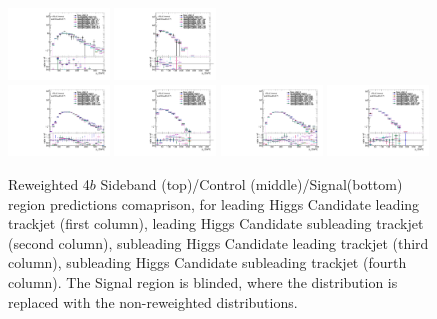 \begin{figure}[htbp!]
\begin{center}
\includegraphics[angle=270, width=0.24\textwidth]{./figures/boosted/AppendixReweight/Compare/Data_FourTag_Control_directcompare_sublHCand_trk0_Pt_1.pdf}
\includegraphics[angle=270, width=0.24\textwidth]{./figures/boosted/AppendixReweight/Compare/Data_FourTag_Control_directcompare_sublHCand_trk1_Pt_1.pdf}\\
\includegraphics[angle=270, width=0.24\textwidth]{./figures/boosted/AppendixReweight/Compare/Data_FourTag_Signal_directcompare_leadHCand_trk0_Pt_1.pdf}
\includegraphics[angle=270, width=0.24\textwidth]{./figures/boosted/AppendixReweight/Compare/Data_FourTag_Signal_directcompare_leadHCand_trk1_Pt_1.pdf}
\includegraphics[angle=270, width=0.24\textwidth]{./figures/boosted/AppendixReweight/Compare/Data_FourTag_Signal_directcompare_sublHCand_trk0_Pt_1.pdf}
\includegraphics[angle=270, width=0.24\textwidth]{./figures/boosted/AppendixReweight/Compare/Data_FourTag_Signal_directcompare_sublHCand_trk1_Pt_1.pdf}\\
\caption{Reweighted 4$b$ Sideband (top)/Control (middle)/Signal(bottom) region predictions comaprison, for leading Higgs Candidate leading trackjet \pt (first column),  leading Higgs Candidate subleading trackjet \pt (second column), subleading Higgs Candidate leading trackjet \pt (third column), subleading Higgs Candidate subleading trackjet \pt (fourth column). The Signal region is blinded, where the distribution is replaced with the non-reweighted distributions.}
\label{fig:app-rw-comp-4b-trkjet}
\end{center}
\end{figure}

\clearpage
